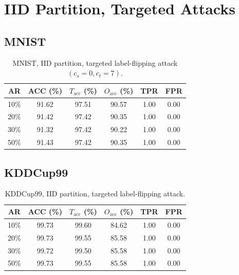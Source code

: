 \clearpage
\section{IID Partition, Targeted Attacks}
\label{sec:res-IID-targ}

\subsection{MNIST}
\label{sec:res-IID-targ-mnist}

\begin{table}[H]
\centering
\caption{MNIST, IID partition, targeted label-flipping attack $(c_s=0,c_t=7)$.}
\label{tab:res-IID-targ-mnist}
\begin{tabular}{@{}cccccc@{}}
\toprule
\textbf{AR} & \textbf{ACC (\%)} & \textbf{$T_{\text{acc}}$ (\%)} & \textbf{$O_{\text{acc}}$ (\%)} & \textbf{TPR} & \textbf{FPR} \\
\midrule
10\% & 91.62 & 97.51 & 90.57 & 1.00 & 0.00 \\
20\% & 91.42 & 97.42 & 90.35 & 1.00 & 0.00 \\
30\% & 91.32 & 97.42 & 90.22 & 1.00 & 0.00 \\
50\% & 91.43 & 97.42 & 90.35 & 1.00 & 0.00 \\
\bottomrule
\end{tabular}
\end{table}

\subsection{KDDCup99}
\label{sec:res-IID-targ-kdd}

\begin{table}[H]
\centering
\caption{KDDCup99, IID partition, targeted label-flipping attack.}
\label{tab:res-IID-targ-kdd}
\begin{tabular}{@{}cccccc@{}}
\toprule
\textbf{AR} & \textbf{ACC (\%)} & \textbf{$T_{\text{acc}}$ (\%)} & \textbf{$O_{\text{acc}}$ (\%)} & \textbf{TPR} & \textbf{FPR} \\
\midrule
10\% & 99.73 & 99.60 & 84.62 & 1.00 & 0.00 \\
20\% & 99.73 & 99.55 & 85.58 & 1.00 & 0.00 \\
30\% & 99.72 & 99.50 & 85.58 & 1.00 & 0.00 \\
50\% & 99.73 & 99.55 & 85.58 & 1.00 & 0.00 \\
\bottomrule
\end{tabular}
\end{table}

